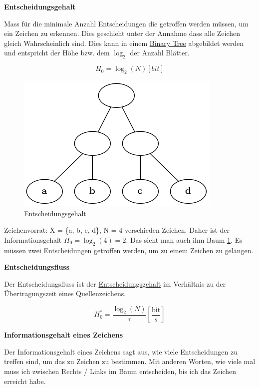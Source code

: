 \documentclass[11pt,twoside,twocolumn,landscape]{article}
\begin{document}
\textbf{Entscheidungsgehalt}

Mass für die minimale Anzahl Entscheidungen die getroffen werden müssen, um ein Zeichen zu erkennen.
Dies geschieht unter der Annahme dass alle Zeichen gleich Wahrscheinlich sind.
Dies kann in einem \href{../../../roam/20210806225200-binary_tree.org}{Binary Tree} abgebildet werden und entspricht der Höhe bzw. dem \(\log_2\) der Anzahl Blätter.

\begin{equation}
H_0 = \log_2(N)[bit]
\end{equation}

\begin{figure}[htbp]
\centering
\includegraphics[width=.9\linewidth]{img/entscheidungsgehalt_tree.png}
\caption{\label{fig:orgc11eeff}Entscheidungsgehalt}
\end{figure}

Zeichenvorrat: X = \{a, b, c, d\}, N = 4 verschieden Zeichen.
Daher ist der Informationsgehalt \(H_0 = \log_2(4) = 2\).
Das sieht man auch ihm Baum \ref{fig:orgc11eeff}.
Es müssen zwei Entscheidungen getroffen werden, um zu einem Zeichen zu gelangen.

\textbf{Entscheidungsfluss}

Der Entscheidungsfluss ist der \href{../../../roam/20211001174136-was_ist_der_entscheidungsgehalt.org}{Entscheidungsgehalt} im Verhältnis zu der Übertragungszeit eines Quellenzeichens.

\begin{equation}
H_0^* = \frac{\log_2(N)}{\tau}[\frac{\text{bit}}{s}]
\end{equation}

\textbf{Informationsgehalt eines Zeichens}

Der Informationsgehalt eines Zeichens sagt aus, wie viele Entscheidungen zu treffen sind, um das zu Zeichen zu bestimmen.
Mit anderen Worten, wie viele mal muss ich zwischen Rechts / Links im Baum entscheiden, bis ich das Zeichen erreicht habe.
\end{document}
